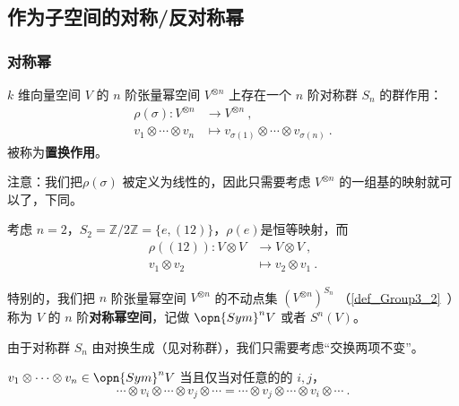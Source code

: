 
\begin{issues}
\issueTODO
\issueDraft
{}
\end{issues}


\subsection{作为子空间的对称/反对称幂}

\subsubsection{对称幂}

$k$ 维向量空间 $V$ 的 $n$ 阶张量幂空间 $V^{\otimes n}$ 上存在一个 $n$ 阶对称群 $S_n$ 的群作用：
\begin{equation}
\begin{aligned}
\rho(\sigma): V^{\otimes n} &\to V^{\otimes n}~, \\
v_1 \otimes \cdots \otimes v_n &\mapsto v_{\sigma(1)} \otimes \cdots \otimes v_{\sigma(n)}~.
\end{aligned}
\end{equation}
被称为\textbf{置换作用}。

注意：我们把$\rho(\sigma)$ 被定义为线性的，因此只需要考虑 $V^{\otimes n}$ 的一组基的映射就可以了，下同。

\begin{example}{}
考虑 $n = 2$，$S_2 = \mathbb{Z}/2\mathbb{Z} = \{e, (1 2)\}$，$\rho(e)$是恒等映射，而
\begin{equation}
\begin{aligned}
\rho((1 2)): V \otimes V &\to V \otimes V~, \\
v_1 \otimes v_2 &\mapsto v_2 \otimes v_1~.
\end{aligned}
\end{equation}
\end{example}

特别的，我们把 $n$ 阶张量幂空间 $V^{\otimes n}$ 的不动点集 $(V^{\otimes n})^{S_n}$ （\autoref{def_Group3_2}~）称为 $V$ 的 $n$ 阶\textbf{对称幂空间}，记做 $\opn{Sym}^n V$ 或者 $S^n(V)$。

由于对称群 $S_n$ 由对换生成（见对称群），我们只需要考虑“交换两项不变”。
\begin{theorem}{}
$v_1 \otimes \cdots \otimes v_n \in \opn{Sym}^n V$ 当且仅当对任意的的 $i, j$，
\begin{equation}
\cdots \otimes v_i \otimes \cdots \otimes v_j \otimes \cdots = \cdots \otimes v_j \otimes \cdots \otimes v_i \otimes \cdots~.
\end{equation}

\end{theorem}

